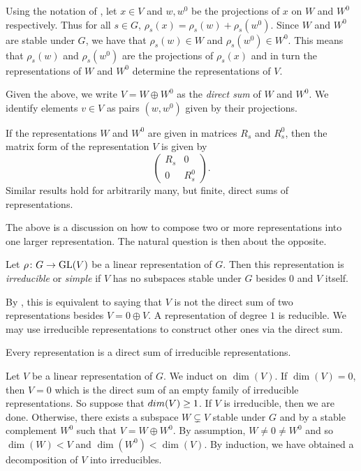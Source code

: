 \documentclass[letterpaper, 11pt, oneside]{book}
\begin{document}
Using the notation of , let $x \in V$ and $w, w^{0}$ be the projections of $x$ on $W$ and $W^{0}$ respectively.
Thus for all $s \in G$, $\rho_{s}(x) = \rho_{s}(w) + \rho_{s}(w^{0})$.
Since $W$ and $W^{0}$ are stable under $G$, we have that $\rho_{s}(w) \in W$ and $\rho_{s}(w^{0}) \in W^{0}$.
This means that $\rho_{s}(w)$ and $\rho_{s}(w^{0})$ are the projections of $\rho_{s}(x)$ and in turn the representations of $W$ and $W^{0}$ determine the representations of $V$.
\begin{defn}
  Given the above, we write $V = W \oplus W^{0}$ as the \emph{direct sum} of $W$ and $W^{0}$.
  We identify elements $v \in V$ as pairs $(w, w^{0})$ given by their projections.
\end{defn}
If the representations $W$ and $W^{0}$ are given in matrices $R_{s}$ and $R_{s}^{0}$, then the matrix form of the representation $V$ is given by
\[
  \begin{pmatrix} R_{s} & 0 \\ 0 & R_{s}^{0} \end{pmatrix}.
\]
Similar results hold for arbitrarily many, but finite, direct sums of representations.

The above is a discussion on how to compose two or more representations into one larger representation.
The natural question is then about the opposite.
\begin{defn}
  Let $\rho\colon G \to \operatorname{GL}(V)$ be a linear representation of $G$.
  Then this representation is \emph{irreducible} or \emph{simple} if $V$ has no subspaces stable under $G$ besides $0$ and $V$ itself.
\end{defn}
By , this is equivalent to saying that $V$ is not the direct sum of two representations besides $V = 0 \oplus V$.
A representation of degree $1$ is reducible.
We may use irreducible representations to construct other ones via the direct sum.

\begin{thrm}
  Every representation is a direct sum of irreducible representations.
\end{thrm}
\begin{pf}
  Let $V$ be a linear representation of $G$.
  We induct on $\dim(V)$.
  If $\dim(V) = 0$, then $V = 0$ which is the direct sum of an empty family of irreducible representations.
  So suppose that $\\dim(V) \geq 1$.
  If $V$ is irreducible, then we are done.
  Otherwise, there exists a subspace $W \subsetneq V$ stable under $G$ and by  a stable complement $W^{0}$ such that $V = W \oplus W^{0}$.
  By assumption, $W \neq 0 \neq W^{0}$ and so $\dim(W) < V$ and $\dim(W^{0}) < \dim(V)$.
  By induction, we have obtained a decomposition of $V$ into irreducibles.
\end{pf}
\end{document}
